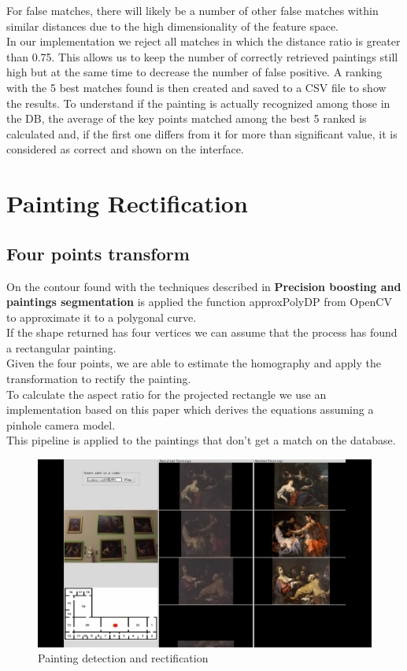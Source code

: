 \documentclass[conference]{IEEEtran}
\begin{document}
For false matches, there will likely be a number of other false matches within similar distances due to the high dimensionality of the feature space.\\
In our implementation we reject all matches in which the distance ratio is greater than 0.75.
This allows us to keep the number of correctly retrieved paintings still high but at the same time to decrease the number of false positive.
A ranking with the 5 best matches found is then created and saved to a CSV file to show the results.
To understand if the painting is actually recognized among those in the DB, the average of the key points matched among the best 5 ranked is calculated and, if the first one differs from it for more than significant value, it is considered as correct and shown on the interface.\\


\section{Painting Rectification}
\subsection{Four points transform}
On the contour found with the techniques described in \textbf{Precision boosting and paintings segmentation} is applied the function approxPolyDP from OpenCV to approximate it to a polygonal curve.\\
If the shape returned has four vertices we can assume that the process has found a rectangular painting.\\
Given the four points, we are able to estimate the homography and apply the transformation to rectify the painting.\\
To calculate the aspect ratio for the projected rectangle we use an implementation based on this paper \cite{b10} which derives the equations assuming a pinhole camera model.\\
This pipeline is applied to the paintings that don't get a match on the database.

\begin{figure}[htbp]
\centerline{\includegraphics[width=0.8\columnwidth]{../detection_and_rectification/top_association_vid05.png}}
\caption{Painting detection and rectification}
\label{fig_Painting_detection_and_rectification}
\end{figure}
\end{document}

